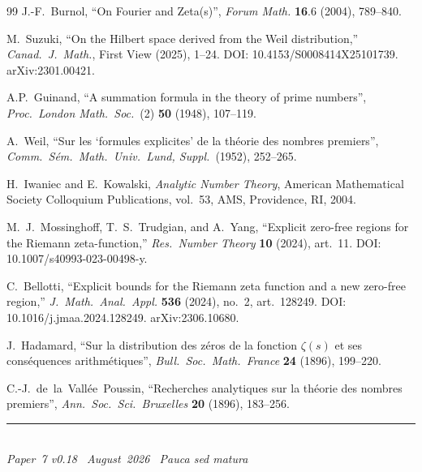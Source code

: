 \documentclass[11pt]{article}
\begin{document}
\begin{thebibliography}{99}
J.-F.~Burnol,
``On Fourier and Zeta(s)'',
\emph{Forum Math.} \textbf{16}.6 (2004), 789--840.

M.~Suzuki,
``On the Hilbert space derived from the Weil distribution,''
\textit{Canad.\ J.\ Math.}, First View (2025), 1--24.
DOI: 10.4153/S0008414X25101739.
arXiv:2301.00421.

A.P.~Guinand,
``A summation formula in the theory of prime numbers'',
\emph{Proc.\ London Math.\ Soc.}\ (2) \textbf{50} (1948), 107--119.

A.~Weil,
``Sur les `formules explicites' de la th\'{e}orie des nombres premiers'',
\emph{Comm.\ S\'{e}m.\ Math.\ Univ.\ Lund, Suppl.}\ (1952), 252--265.

H.~Iwaniec and E.~Kowalski,
\emph{Analytic Number Theory},
American Mathematical Society Colloquium Publications,
vol.~53, AMS, Providence, RI, 2004.

M.~J.~Mossinghoff, T.~S.~Trudgian, and A.~Yang,
``Explicit zero-free regions for the Riemann zeta-function,''
\textit{Res.\ Number Theory} \textbf{10} (2024), art.~11.
DOI: 10.1007/s40993-023-00498-y.

C.~Bellotti,
``Explicit bounds for the Riemann zeta function
and a new zero-free region,''
\textit{J.\ Math.\ Anal.\ Appl.} \textbf{536} (2024),
no.~2, art.~128249.
DOI: 10.1016/j.jmaa.2024.128249.
arXiv:2306.10680.

J.~Hadamard,
``Sur la distribution des z\'{e}ros de la fonction $\zeta(s)$
et ses cons\'{e}quences arithm\'{e}tiques'',
\emph{Bull.\ Soc.\ Math.\ France} \textbf{24} (1896), 199--220.

C.-J.~de~la~Vall\'{e}e~Poussin,
``Recherches analytiques sur la th\'{e}orie des nombres premiers'',
\emph{Ann.\ Soc.\ Sci.\ Bruxelles} \textbf{20} (1896), 183--256.

\end{thebibliography}

\enlargethispage{3\baselineskip}
\vspace*{\fill}
\begin{minipage}{\linewidth}
\rule{\linewidth}{0.4pt}\smallskip\\
\small\emph{Paper~7 v0.18 \textperiodcentered\ August~2026
\textperiodcentered\ Pauca sed matura}
\end{minipage}
\end{document}
